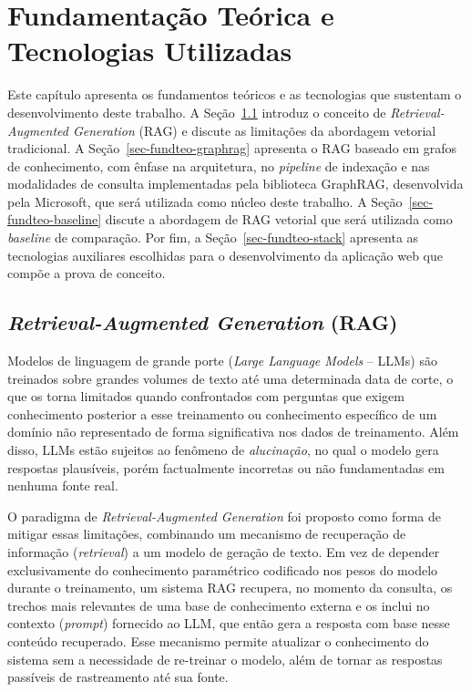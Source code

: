 \chapter{Fundamentação Teórica e Tecnologias Utilizadas}
\label{sec-fundteo}

Este capítulo apresenta os fundamentos teóricos e as tecnologias que
sustentam o desenvolvimento deste trabalho. A Seção~\ref{sec-fundteo-rag}
introduz o conceito de \textit{Retrieval-Augmented Generation} (RAG) e discute
as limitações da abordagem vetorial tradicional. A
Seção~\ref{sec-fundteo-graphrag} apresenta o RAG baseado em grafos de
conhecimento, com ênfase na arquitetura, no \textit{pipeline} de indexação e
nas modalidades de consulta implementadas pela biblioteca GraphRAG,
desenvolvida pela Microsoft, que será utilizada como núcleo deste trabalho. A
Seção~\ref{sec-fundteo-baseline} discute a abordagem de RAG vetorial que será
utilizada como \textit{baseline} de comparação. Por fim, a
Seção~\ref{sec-fundteo-stack} apresenta as tecnologias auxiliares escolhidas
para o desenvolvimento da aplicação web que compõe a prova de conceito.

\section{\textit{Retrieval-Augmented Generation} (RAG)}
\label{sec-fundteo-rag}

Modelos de linguagem de grande porte (\textit{Large Language Models} -- LLMs) \cite{vaswani2017attention, brown2020language}
são treinados sobre grandes volumes de texto até uma determinada data de
corte, o que os torna limitados quando confrontados com perguntas que exigem
conhecimento posterior a esse treinamento ou conhecimento específico de um
domínio não representado de forma significativa nos dados de treinamento. Além disso, LLMs estão
sujeitos ao fenômeno de \textit{alucinação}, no qual o modelo gera respostas
plausíveis, porém factualmente incorretas ou não fundamentadas em nenhuma
fonte real.

O paradigma de \textit{Retrieval-Augmented Generation} \cite{lewis2020retrieval}
foi proposto como forma de mitigar essas limitações, combinando um mecanismo
de recuperação de informação (\textit{retrieval}) a um modelo de geração de
texto. Em vez de depender exclusivamente do conhecimento paramétrico
codificado nos pesos do modelo durante o treinamento, um sistema RAG recupera,
no momento da consulta, os trechos mais relevantes de uma base de
conhecimento externa e os inclui no contexto (\textit{prompt}) fornecido ao
LLM, que então gera a resposta com base nesse conteúdo recuperado. Esse
mecanismo permite atualizar o conhecimento do sistema sem a necessidade de
re-treinar o modelo, além de tornar as respostas passíveis de rastreamento até
sua fonte.


